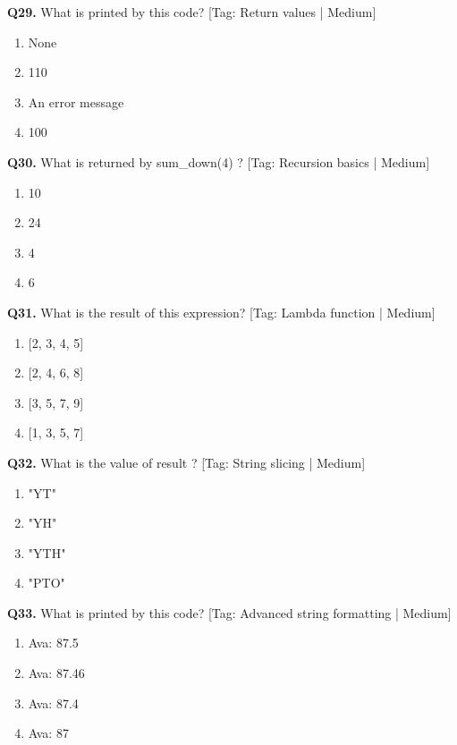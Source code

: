 \vspace{2mm}
\noindent\textbf{Q29.} What is printed by this code? \hfill [Tag: Return values | Medium]
\begin{enumerate}[label=(\alph*),topsep=2pt,itemsep=1pt,partopsep=0pt,parsep=0pt]
    \item {None}
    \item {110}
    \item {An error message}
    \item {100}
\end{enumerate}
\vspace{2mm}
\noindent\textbf{Q30.} What is returned by sum\_down(4) ? \hfill [Tag: Recursion basics | Medium]
\begin{enumerate}[label=(\alph*),topsep=2pt,itemsep=1pt,partopsep=0pt,parsep=0pt]
    \item {10}
    \item {24}
    \item {4}
    \item {6}
\end{enumerate}
\vspace{2mm}
\noindent\textbf{Q31.} What is the result of this expression? \hfill [Tag: Lambda function | Medium]
\begin{enumerate}[label=(\alph*),topsep=2pt,itemsep=1pt,partopsep=0pt,parsep=0pt]
    \item {[2, 3, 4, 5]}
    \item {[2, 4, 6, 8]}
    \item {[3, 5, 7, 9]}
    \item {[1, 3, 5, 7]}
\end{enumerate}
\vspace{2mm}
\noindent\textbf{Q32.} What is the value of result ? \hfill [Tag: String slicing | Medium]
\begin{enumerate}[label=(\alph*),topsep=2pt,itemsep=1pt,partopsep=0pt,parsep=0pt]
    \item {"YT"}
    \item {"YH"}
    \item {"YTH"}
    \item {"PTO"}
\end{enumerate}
\vspace{2mm}
\noindent\textbf{Q33.} What is printed by this code? \hfill [Tag: Advanced string formatting | Medium]
\begin{enumerate}[label=(\alph*),topsep=2pt,itemsep=1pt,partopsep=0pt,parsep=0pt]
    \item {Ava: 87.5}
    \item {Ava: 87.46}
    \item {Ava: 87.4}
    \item {Ava: 87}
\end{enumerate}
